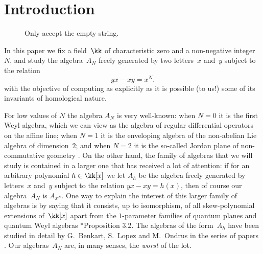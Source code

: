 {}%
\section*{Introduction}

\begin{figure}[H]
  \centering
  \caption{Only accept the empty string.}
  \label{fig:empty}
\end{figure}

In this paper we fix a field~$\kk$ of characteristic zero and a
non-negative integer~$N$, and study the algebra~$A_N$ freely
generated by two letters~$x$ and~$y$ subject to the relation
  \[
  yx-xy = x^N.
  \]
with the objective of computing as explicitly as it is possible (to us!)
some of its invariants of homological nature.

For low values of $N$ the algebra $A_N$ is very well-known: when $N=0$ it is
the first Weyl algebra, which we can view as the algebra of regular
differential operators on the affine line; when $N=1$ it is the enveloping
algebra of the non-abelian Lie algebra of dimension~$2$; and when $N=2$ it
is the so-called Jordan plane of non-commutative geometry
. On the other hand, the family of algebras
that we will study is contained in a larger one that has received a lot of
attention: if for an arbitrary polynomial $h\in\kk[x]$ we let $A_h$ be the
algebra freely generated by letters~$x$ and~$y$ subject to the relation
$yx-xy=h(x)$, then of course our algebra~$A_N$ is $A_{x^N}$. One way to
explain the interest of this larger family of algebras is by saying that it
consists, up to isomorphism, of all skew-polynomial extensions of~$\kk[x]$
apart from the $1$-parameter families of quantum planes and quantum Weyl algebras
\cite{AD}*{Proposition 3.2}. The algebras of the form~$A_h$ have been
studied in detail by G.~Benkart, S.~Lopez and M.~Ondrus in the series of
papers . Our
algebras~$A_N$ are, in many senses, the \emph{worst} of the lot.

